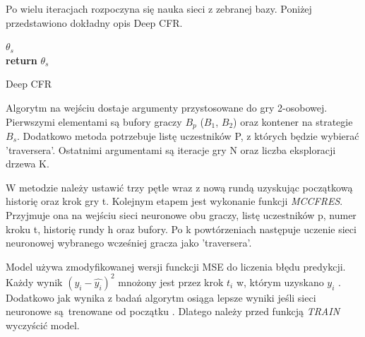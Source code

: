 \documentclass[12pt,oneside,a4paper]{report}
\begin{document}
Po wielu iteracjach
rozpoczyna się nauka sieci z zebranej bazy. Poniżej przedstawiono dokładny opis Deep CFR.
\vspace{1cm}

\begin{algorithm}[H]
\DontPrintSemicolon
  
$\theta_{s}$ \leftarrow {} \\
\textbf{return} $\theta_{s}$
 \caption{Deep CFR}
\end{algorithm}

\vspace{1cm}
Algorytm na wejściu dostaje argumenty przystosowane do gry 2-osobowej.
Pierwszymi elementami są bufory graczy $B_{p}$ ($B_{1}$, $B_{2}$) oraz kontener na 
strategie $B_{s}$.
Dodatkowo metoda potrzebuje listę uczestników P, z których będzie wybierać 'traversera'.
Ostatnimi argumentami są iteracje gry N oraz liczba eksploracji drzewa K.


W metodzie należy ustawić trzy pętle wraz z nową rundą uzyskując początkową historię oraz
krok gry t. Kolejnym etapem jest
wykonanie funkcji \emph{MCCFRES}. Przyjmuje ona na wejściu sieci neuronowe obu graczy, 
listę uczestników p,
numer kroku t, historię rundy h oraz bufory. Po k 
powtórzeniach następuje uczenie sieci neuronowej wybranego wcześniej gracza jako 'traversera'. 

Model używa 
zmodyfikowanej wersji funckcji MSE do liczenia błędu predykcji. Każdy wynik $(y_{i} - \hat{y_{i}})^2$
mnożony jest przez krok $t_{i}$ w, którym uzyskano $y_{i}$ \cite{DCFR}.
Dodatkowo jak wynika z badań algorytm osiąga lepsze wyniki
jeśli
sieci neuronowe są trenowane od początku \cite{DCFR}. Dlatego należy przed funkcją \emph{TRAIN}
wyczyścić model.
\end{document}
